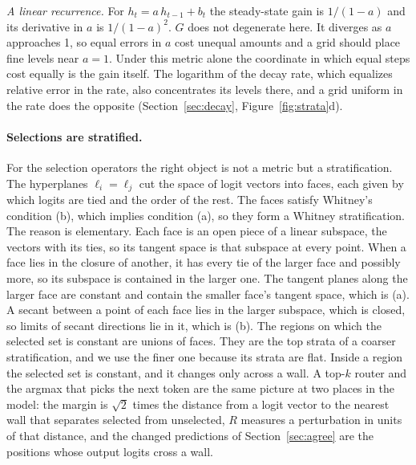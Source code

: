 \documentclass[journal]{IEEEtran}
\begin{document}
\emph{A linear recurrence.} For $h_t = a\,h_{t-1} + b_t$ the steady-state gain is $1/(1-a)$ and
its derivative in $a$ is $1/(1-a)^2$. $G$ does not degenerate here. It diverges as $a$ approaches
1, so equal errors in $a$ cost unequal amounts and a grid should place fine levels near $a=1$.
Under this metric alone the coordinate in which equal steps cost equally is the gain itself.
The logarithm of the decay rate, which equalizes relative error in the rate, also concentrates
its levels there, and a grid uniform in the rate does the opposite (Section~\ref{sec:decay},
Figure~\ref{fig:strata}d).

\paragraph{Selections are stratified.} For the selection operators the right object is not a
metric but a stratification. The hyperplanes $\ell_i = \ell_j$ cut the space of logit vectors
into faces, each given by which logits are tied and the order of the rest. The faces satisfy
Whitney's condition (b), which implies condition (a), so they form a Whitney stratification. The reason
is elementary. Each face is an open piece of a linear subspace, the vectors with its ties, so its
tangent space is that subspace at every point. When a face lies in the closure of another, it has
every tie of the larger face and possibly more, so its subspace is contained in the larger one.
The tangent planes along the larger face are constant and contain the smaller face's tangent
space, which is (a). A secant between a point of each face lies in the larger subspace, which is
closed, so limits of secant directions lie in it, which is (b). The regions on which the selected
set is constant are unions of faces. They are the top strata of a coarser stratification, and we
use the finer one because its strata are flat. Inside a region the selected set
is constant, and it changes only across a wall. A top-$k$ router and the argmax that picks the
next token are the same picture at two places in the model: the margin is $\sqrt2$ times the distance from a
logit vector to the nearest wall that separates selected from unselected, $R$ measures a
perturbation in units of that distance, and the changed predictions of Section~\ref{sec:agree}
are the positions whose output logits cross a wall.
\end{document}
